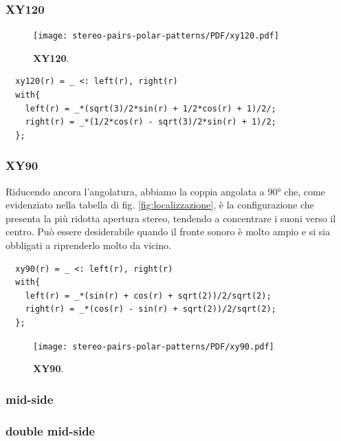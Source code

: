 \subsubsection*{XY120}
\begin{figure}[h]
\begin{center}
\texttt{[image: stereo-pairs-polar-patterns/PDF/xy120.pdf]}
\caption{\textbf{XY120}.}
\label{xy120}
\end{center}
\end{figure}
\begin{lstlisting}
  xy120(r) = _ <: left(r), right(r)
  with{
    left(r) = _*(sqrt(3)/2*sin(r) + 1/2*cos(r) + 1)/2/;
    right(r) = _*(1/2*cos(r) - sqrt(3)/2*sin(r) + 1)/2;
  };
\end{lstlisting}
\subsubsection*{XY90}
Riducendo ancora l’angolatura, abbiamo la coppia angolata a $90°$ che, come
evidenziato nella tabella di fig. \ref{fig:localizzazione}, è la configurazione
che presenta la più ridotta apertura stereo, tendendo a concentrare i suoni
verso il centro. Può essere desiderabile quando il fronte sonoro è molto ampio
e si sia obbligati a riprenderlo molto da vicino.
\begin{lstlisting}
  xy90(r) = _ <: left(r), right(r)
  with{
    left(r) = _*(sin(r) + cos(r) + sqrt(2))/2/sqrt(2);
    right(r) = _*(cos(r) - sin(r) + sqrt(2))/2/sqrt(2);
  };
\end{lstlisting}
\begin{figure}[h]
\begin{center}
\texttt{[image: stereo-pairs-polar-patterns/PDF/xy90.pdf]}
\caption{\textbf{XY90}.}
\label{xy90}
\end{center}
\end{figure}
\subsubsection*{mid-side}
\subsubsection*{double mid-side}
